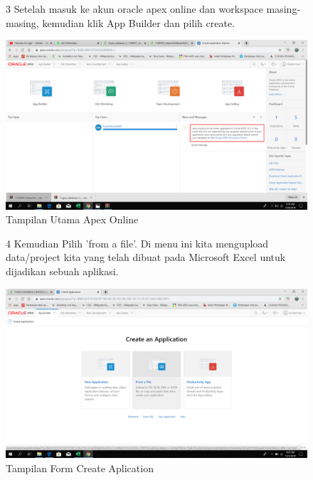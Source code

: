 \begin{enumerate}
\begin{figure}[!htbp]
\item[3]Setelah masuk ke akun oracle apex online dan workspace masing-masing, kemudian klik App Builder dan pilih create.

    \begin{center}
    \includegraphics[scale=0.2]{figures/30.png}
     \caption{Tampilan Utama Apex Online}
    \end{center}   
    \end{figure}

\begin{figure}[!htbp]
\item[4]Kemudian Pilih 'from a file'. Di menu ini kita mengupload data/project kita yang telah dibuat pada Microsoft Excel untuk dijadikan sebuah aplikasi.


    \begin{center}
    \includegraphics[scale=0.2]{figures/7.png}
     \caption{Tampilan Form Create Aplication}
    \end{center}   
    \end{figure}


\end{enumerate}
